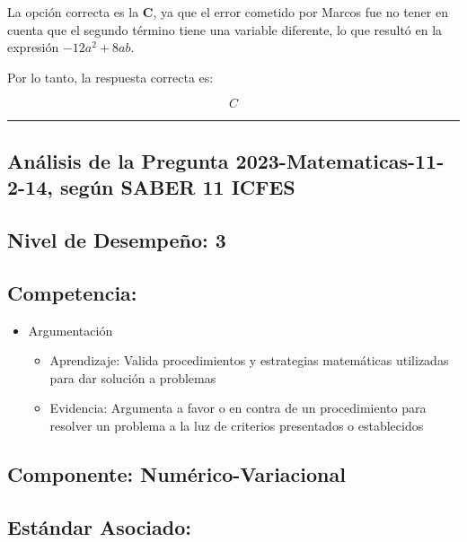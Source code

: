 \documentclass[
]{article}
\providecommand{\tightlist}{%
  \setlength{\itemsep}{0pt}\setlength{\parskip}{0pt}}
\begin{document}
La opción correcta es la \textbf{C}, ya que el error cometido por Marcos
fue no tener en cuenta que el segundo término tiene una variable
diferente, lo que resultó en la expresión \(-12a^2 + 8ab\).

Por lo tanto, la respuesta correcta es:

\[
\boxed{C}
\]

\begin{center}\rule{0.5\linewidth}{0.5pt}\end{center}

\subsection{Análisis de la Pregunta 2023-Matematicas-11-2-14, según
SABER 11
ICFES}\label{anuxe1lisis-de-la-pregunta-2023-matematicas-11-2-14-seguxfan-saber-11-icfes}

\subsection{Nivel de Desempeño: 3}\label{nivel-de-desempeuxf1o-3-2}

\subsection{Competencia:}\label{competencia-2}

\begin{itemize}
\tightlist
\item
  Argumentación

  \begin{itemize}
  \tightlist
  \item
    Aprendizaje: Valida procedimientos y estrategias matemáticas
    utilizadas para dar solución a problemas
  \item
    Evidencia: Argumenta a favor o en contra de un procedimiento para
    resolver un problema a la luz de criterios presentados o
    establecidos
  \end{itemize}
\end{itemize}

\subsection{Componente:
Numérico-Variacional}\label{componente-numuxe9rico-variacional-2}

\subsection{Estándar Asociado:}\label{estuxe1ndar-asociado-4}
\end{document}
